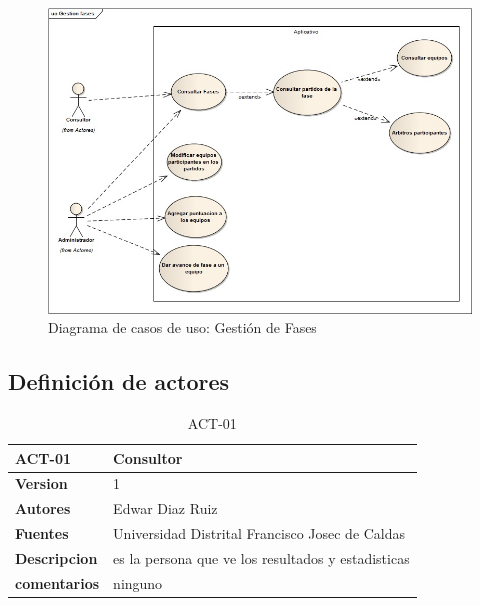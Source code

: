 \begin{figure}[H]
	\centering
	\includegraphics[width=0.8\linewidth]{Designe/imgs/gestionF}
	\caption{Diagrama de casos de uso: Gestión de Fases}
	\label{fig:gestionF}
\end{figure}




\subsection{Definición de actores}
 
 
 
\begin{table}[H]
	\centering
	\caption{ACT-01}
	\label{ACT-01}
	\begin{tabular}{|l|l|}
		\hline
		\textbf{ACT-01}      & \textbf{Consultor}                                 \\ \hline
		\textbf{Version}     & 1                                                  \\ \hline
		\textbf{Autores}     & Edwar Diaz Ruiz                                    \\ \hline
		\textbf{Fuentes}     & Universidad Distrital Francisco Josec de Caldas    \\ \hline
		\textbf{Descripcion} & es la persona que ve los resultados y estadisticas \\ \hline
		\textbf{comentarios} & ninguno             \\ \hline
	\end{tabular}
\end{table}

